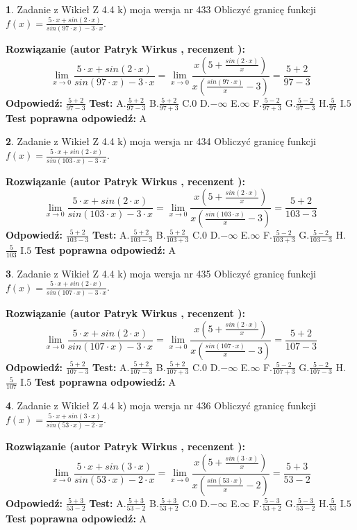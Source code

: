 \documentclass[12pt, a4paper]{article}
\theoremstyle{definition} %
\newtheorem{zad}{}
\newcommand{\zadStart}[1]{\begin{zad}#1\newline}
\newcommand{\zadStop}{\end{zad}}
\newcommand{\rozwStart}[2]{\noindent \textbf{Rozwiązanie (autor #1 , recenzent #2): }\newline}
\newcommand{\rozwStop}{\newline}
\newcommand{\odpStart}{\noindent \textbf{Odpowiedź:}\newline}
\newcommand{\odpStop}{\newline}
\newcommand{\testStart}{\noindent \textbf{Test:}\newline}
\newcommand{\testStop}{\newline}
\newcommand{\kluczStart}{\noindent \textbf{Test poprawna odpowiedź:}\newline}
\newcommand{\kluczStop}{\newline}
\begin{document}
\zadStart{Zadanie z Wikieł Z 4.4 k) moja wersja nr 433}
Obliczyć granicę funkcji $f(x)=\frac{5\cdot x +sin(2\cdot x)}{sin(97\cdot x) -3\cdot x}$.
\zadStop
\rozwStart{Patryk Wirkus}{}
$$\lim\limits_{x\to 0}\frac{5\cdot x +sin(2\cdot x)}{sin(97\cdot x) -3\cdot x}
=\lim\limits_{x\to 0}\frac{x(5+\frac{sin(2\cdot x)}{x})}{x(\frac{sin(97\cdot x)}{x}-3)}
=\frac{5+2}{97-3}$$
\rozwStop
\odpStart
$\frac{5+2}{97-3}$
\odpStop
\testStart
A.$\frac{5+2}{97-3}$
B.$\frac{5+2}{97+3}$
C.$0$
D.$-\infty$
E.$\infty$
F.$\frac{5-2}{97+3}$
G.$\frac{5-2}{97-3}$
H.$\frac{5}{97}$
I.$5$
\testStop
\kluczStart
A
\kluczStop



\zadStart{Zadanie z Wikieł Z 4.4 k) moja wersja nr 434}
Obliczyć granicę funkcji $f(x)=\frac{5\cdot x +sin(2\cdot x)}{sin(103\cdot x) -3\cdot x}$.
\zadStop
\rozwStart{Patryk Wirkus}{}
$$\lim\limits_{x\to 0}\frac{5\cdot x +sin(2\cdot x)}{sin(103\cdot x) -3\cdot x}
=\lim\limits_{x\to 0}\frac{x(5+\frac{sin(2\cdot x)}{x})}{x(\frac{sin(103\cdot x)}{x}-3)}
=\frac{5+2}{103-3}$$
\rozwStop
\odpStart
$\frac{5+2}{103-3}$
\odpStop
\testStart
A.$\frac{5+2}{103-3}$
B.$\frac{5+2}{103+3}$
C.$0$
D.$-\infty$
E.$\infty$
F.$\frac{5-2}{103+3}$
G.$\frac{5-2}{103-3}$
H.$\frac{5}{103}$
I.$5$
\testStop
\kluczStart
A
\kluczStop



\zadStart{Zadanie z Wikieł Z 4.4 k) moja wersja nr 435}
Obliczyć granicę funkcji $f(x)=\frac{5\cdot x +sin(2\cdot x)}{sin(107\cdot x) -3\cdot x}$.
\zadStop
\rozwStart{Patryk Wirkus}{}
$$\lim\limits_{x\to 0}\frac{5\cdot x +sin(2\cdot x)}{sin(107\cdot x) -3\cdot x}
=\lim\limits_{x\to 0}\frac{x(5+\frac{sin(2\cdot x)}{x})}{x(\frac{sin(107\cdot x)}{x}-3)}
=\frac{5+2}{107-3}$$
\rozwStop
\odpStart
$\frac{5+2}{107-3}$
\odpStop
\testStart
A.$\frac{5+2}{107-3}$
B.$\frac{5+2}{107+3}$
C.$0$
D.$-\infty$
E.$\infty$
F.$\frac{5-2}{107+3}$
G.$\frac{5-2}{107-3}$
H.$\frac{5}{107}$
I.$5$
\testStop
\kluczStart
A
\kluczStop



\zadStart{Zadanie z Wikieł Z 4.4 k) moja wersja nr 436}
Obliczyć granicę funkcji $f(x)=\frac{5\cdot x +sin(3\cdot x)}{sin(53\cdot x) -2\cdot x}$.
\zadStop
\rozwStart{Patryk Wirkus}{}
$$\lim\limits_{x\to 0}\frac{5\cdot x +sin(3\cdot x)}{sin(53\cdot x) -2\cdot x}
=\lim\limits_{x\to 0}\frac{x(5+\frac{sin(3\cdot x)}{x})}{x(\frac{sin(53\cdot x)}{x}-2)}
=\frac{5+3}{53-2}$$
\rozwStop
\odpStart
$\frac{5+3}{53-2}$
\odpStop
\testStart
A.$\frac{5+3}{53-2}$
B.$\frac{5+3}{53+2}$
C.$0$
D.$-\infty$
E.$\infty$
F.$\frac{5-3}{53+2}$
G.$\frac{5-3}{53-2}$
H.$\frac{5}{53}$
I.$5$
\testStop
\kluczStart
A
\kluczStop
\end{document}
